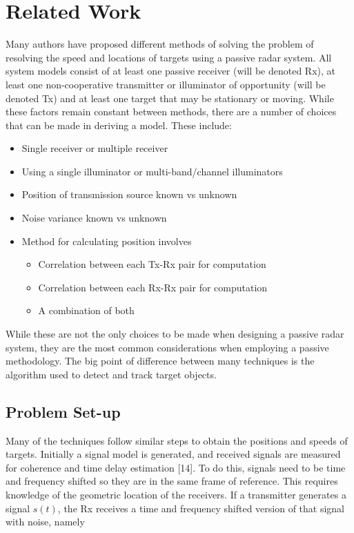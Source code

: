 \documentclass[12pt,openany,a4paper]{book}
\begin{document}
\section{Related Work}

Many authors have proposed different methods of solving the problem of resolving the speed and locations of targets using a passive radar system. All system models consist of at least one passive receiver (will be denoted Rx), at least one non-cooperative transmitter or illuminator of opportunity (will be denoted Tx) and at least one target that may be stationary or moving. While these factors remain constant between methods, there are a number of choices that can be made in deriving a model. These include:

\begin{itemize}
\item{Single receiver or multiple receiver}
\item{Using a single illuminator or multi-band/channel illuminators}
\item{Position of transmission source known vs unknown}
\item{Noise variance known vs unknown}
\item{Method for calculating position involves}
	\begin{itemize}
	\item{Correlation between each Tx-Rx pair for computation}
	\item{Correlation between each Rx-Rx pair for computation}
	\item{A combination of both}
	\end{itemize}
\end{itemize}

While these are not the only choices to be made when designing a passive radar system, they are the most common considerations when employing a passive methodology. The big point of difference between many techniques is the algorithm used to detect and track target objects.

\subsection{Problem Set-up}

Many of the techniques follow similar steps to obtain the positions and speeds of targets. Initially a signal model is generated, and received signals are measured for coherence and time delay estimation [14]. To do this, signals need to be time and frequency shifted so they are in the same frame of reference. This requires knowledge of the geometric location of the receivers. If a transmitter generates a signal $s(t)$, the Rx receives a time and frequency shifted version of that signal with noise, namely
\end{document}
